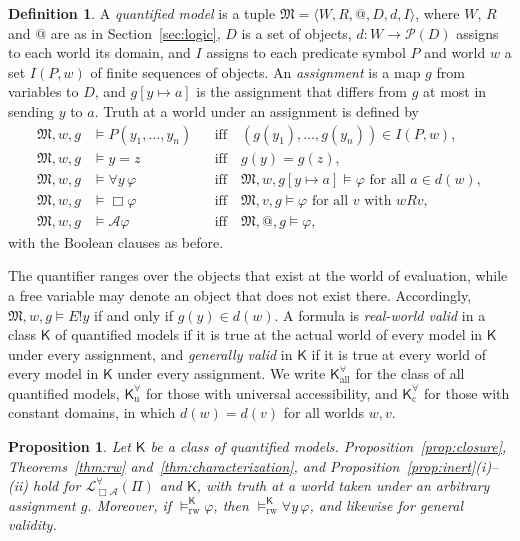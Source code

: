 \documentclass[11pt]{amsart}
\makeatletter
\theoremstyle{plain}
\newtheorem{proposition}[theorem]{Proposition}
\theoremstyle{definition}
\newtheorem{definition}[theorem]{Definition}
\theoremstyle{remark}
\newcommand{\Act}{\mathcal{A}}
\newcommand{\Lang}{\mathcal{L}_{\Box\Act}}
\newcommand{\Mod}{\mathfrak{M}}
\newcommand{\Kl}{\mathsf{K}}
\newcommand{\at}{@}
\newcommand{\RWv}[1]{\models^{#1}_{\mathrm{rw}}}
\makeatother
\begin{document}
\begin{definition}
A \emph{quantified model} is a tuple
$\Mod = \langle W, R, \at, D, d, I\rangle$, where $W$, $R$ and $\at$
are as in Section~\ref{sec:logic}, $D$ is a set of objects,
$d\colon W \to \mathcal{P}(D)$ assigns to each world its domain, and
$I$ assigns to each predicate symbol $P$ and world $w$ a set
$I(P,w)$ of finite sequences of objects. An \emph{assignment} is a map
$g$ from variables to $D$, and $g[y \mapsto a]$ is the assignment that
differs from $g$ at most in sending $y$ to $a$. Truth at a world under
an assignment is defined by
\begin{align*}
  \Mod, w, g &\models P(y_1, \ldots, y_n) &&\text{iff}\quad
    (g(y_1), \ldots, g(y_n)) \in I(P,w),\\
  \Mod, w, g &\models y = z &&\text{iff}\quad g(y) = g(z),\\
  \Mod, w, g &\models \forall y\,\varphi &&\text{iff}\quad
    \Mod, w, g[y \mapsto a] \models \varphi \text{ for all } a \in d(w),\\
  \Mod, w, g &\models \Box\varphi &&\text{iff}\quad
    \Mod, v, g \models \varphi \text{ for all } v \text{ with } wRv,\\
  \Mod, w, g &\models \Act\varphi &&\text{iff}\quad
    \Mod, \at, g \models \varphi,
\end{align*}
with the Boolean clauses as before.
\end{definition}

The quantifier ranges over the objects that exist at the world of
evaluation, while a free variable may denote an object that does not
exist there. Accordingly, $\Mod, w, g \models E!y$ if and only if
$g(y) \in d(w)$. A formula is \emph{real-world valid} in a class
$\Kl$ of quantified models if it is true at the actual world of every
model in $\Kl$ under every assignment, and \emph{generally valid} in
$\Kl$ if it is true at every world of every model in $\Kl$ under every
assignment. We write $\Kl^\forall_{\mathrm{all}}$ for the class of all
quantified models, $\Kl^\forall_{\mathrm{u}}$ for those with universal
accessibility, and $\Kl^\forall_{\mathrm{c}}$ for those with constant
domains, in which $d(w) = d(v)$ for all worlds $w, v$.

\begin{proposition}
\label{prop:q-closure}
Let $\Kl$ be a class of quantified models. Proposition~\ref{prop:closure},
Theorems~\ref{thm:rw} and~\ref{thm:characterization}, and
Proposition~\ref{prop:inert}\textup{(i)--(ii)} hold for
$\Lang^\forall(\Pi)$ and $\Kl$, with truth at a world taken under an
arbitrary assignment $g$. Moreover, if $\RWv{\Kl} \varphi$, then
$\RWv{\Kl} \forall y\,\varphi$, and likewise for general validity.
\end{proposition}
\end{document}

